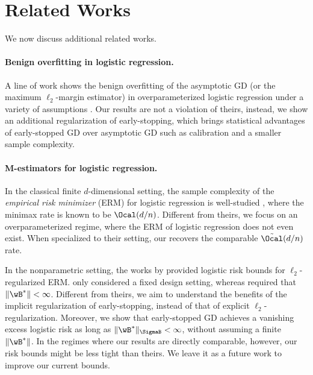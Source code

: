 \section{Related Works}
We now discuss additional related works.


\paragraph{Benign overfitting in logistic regression.} 
A line of work shows the benign overfitting of the asymptotic GD (or the maximum $\ell_2$-margin estimator) in overparameterized logistic regression under a variety of assumptions \citep{montanari2019generalization,chatterji2021finite,cao2021risk,wang2022binary,muthukumar2021classification,shamir2023implicit}. 
Our results are not a violation of theirs, instead, we show an additional regularization of early-stopping, which brings statistical advantages of early-stopped GD over asymptotic GD such as calibration and a smaller sample complexity. 






\paragraph{M-estimators for logistic regression.}
In the classical finite $d$-dimensional setting, the sample complexity of the \emph{empirical risk minimizer} (ERM) for logistic regression is well-studied \citep{ostrovskii2021finite,kuchelmeister2024finite,hsu2024sample,chardon2024finite}, where the minimax rate is known to be $\Ocal(d/n)$.
Different from theirs, we focus on an overparameterized regime, where the ERM of logistic regression does not even exist. When specialized to their setting, our  recovers the comparable $\tilde{\Ocal}(d/n)$ rate.

In the nonparametric setting, the works by \citep{bach2010self,marteau2019beyond} provided logistic risk bounds for $\ell_2$-regularized ERM. 
\citet{bach2010self} only considered a fixed design setting, whereas \citet{marteau2019beyond} required that $\|\wB^*\|<\infty$. 
Different from theirs, we aim to understand the benefits of the implicit regularization of early-stopping, instead of that of explicit $\ell_2$-regularization.
Moreover, we show that early-stopped GD achieves a vanishing excess logistic risk as long as $\|\wB^*\|_{\SigmaB}<\infty$, without assuming a finite $\|\wB^*\|$. In the regimes where our results are directly comparable, however, our risk bounds might be less tight than theirs. We leave it as a future work to improve our current bounds.

